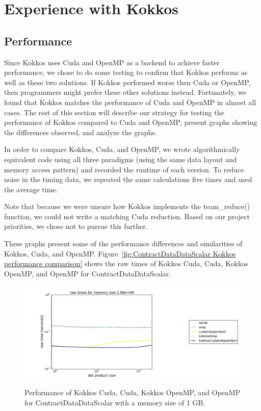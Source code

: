 \chapter{Experience with Kokkos}
\section{Performance}

Since Kokkos uses Cuda and OpenMP as a backend to achieve faster performance, we
chose to do some testing to confirm that Kokkos performs as well as these two
solutions. If Kokkos performed worse then Cuda or OpenMP, then programmers might
prefer these other solutions instead.  Fortunately, we found that Kokkos matches
the performance of Cuda and OpenMP in almost all cases.  The rest of this
section will describe our strategy for testing the performance of Kokkos
compared to Cuda and OpenMP, present graphs showing the differences observed,
and analyze the graphs.

In order to compare Kokkos, Cuda, and OpenMP, we wrote algorithmically
equivalent code using all three paradigms (using the same data layout and memory
access pattern) and recorded the runtime of each version.  To reduce noise in
the timing data, we repeated the same calculations five times and used the
average time.

Note that because we were unsure how Kokkos implements the team\_reduce()
function, we could not write a matching Cuda reduction.  Based on our project
priorities, we chose not to pursue this further.

These graphs present some of the performance differences and similarities of
Kokkos, Cuda, and OpenMP. Figure~\ref{fig:ContractDataDataScalar Kokkos
performance comparison} shows the raw times of Kokkos Cuda, Cuda, Kokkos OpenMP,
and OpenMP for ContractDataDataScalar.

\begin{figure}[!ht]
{\includegraphics[scale=.4]{CDDS_RawTimes_2d_largestSize_Comparison.pdf}}
\caption[ContractDataDataScalar Kokkos performance comparison]{
    Performance of Kokkos Cuda, Cuda, Kokkos OpenMP,
and OpenMP for ContractDataDataScalar with a memory size of 1 GB.}
\label{fig:ContractDataDataScalar Kokkos performance comparison}
\end{figure}

